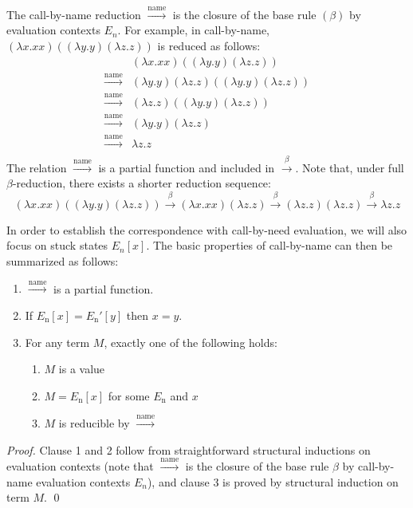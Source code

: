 \documentclass[english]{sumiilab-paper}
\newcommand{\FULLBETA}{\xrightarrow{\beta}}
\newcommand{\CALLBYNAME}{\xrightarrow{\mathrm{name}}}
\begin{document}
The call-by-name reduction $\CALLBYNAME$ is the closure of the base rule $(\beta)$ by evaluation contexts $E_n$.
For example, in call-by-name,
$(\lambda x.xx)((\lambda y.y)(\lambda z.z))$
is reduced as follows:
\[ \begin{array}{ll}
	& (\lambda x.xx)((\lambda y.y)(\lambda z.z)) \\
	\CALLBYNAME & (\lambda y.y)(\lambda z.z)((\lambda y.y)(\lambda z.z)) \\
	\CALLBYNAME & (\lambda z.z)((\lambda y.y)(\lambda z.z)) \\
	\CALLBYNAME & (\lambda y.y)(\lambda z.z) \\
	\CALLBYNAME & \lambda z.z \\
\end{array} \]
The relation $\CALLBYNAME$ is a partial function and included in $\FULLBETA$.
Note that, under full $\beta$-reduction, there exists a shorter reduction sequence:
\[(\lambda x.xx)((\lambda y.y)(\lambda z.z))\FULLBETA(\lambda x.xx)(\lambda z.z)\FULLBETA(\lambda z.z)(\lambda z.z)\FULLBETA\lambda z.z\]

In order to establish the correspondence with call-by-need evaluation, we will also focus on stuck states $E_n[x]$. The basic properties of call-by-name can then be summarized as follows:
%
\begin{lemma}\label{determinism-of-call-by-name} \qquad
	\begin{enumerate}
		\item $\CALLBYNAME$ is a partial function.
		\item If $E_\mathrm{n}[x]=E_\mathrm{n}'[y]$ then $x=y$. \label{enum:det-name-context}
		\item For any term $M$, exactly one of the following holds: \label{enum:det-name-total}
			\begin{enumerate}
				\item $M$ is a value
				\item $M=E_\mathrm{n}[x]$ for some $E_\mathrm{n}$ and $x$ \label{enum:det-name-total-demand}
				\item $M$ is reducible by $\CALLBYNAME$
			\end{enumerate}
	\end{enumerate}
\end{lemma}
%
\begin{proof}\label{proof:determinism-of-call-by-name}
	Clause 1 and 2
	follow from straightforward structural inductions on evaluation contexts
	(note that $\CALLBYNAME$ is the closure of the base rule $\beta$ by call-by-name evaluation contexts $E_n$),
	and clause 3
	is proved by structural induction on term $M$. \qed
\end{proof}
\end{document}
